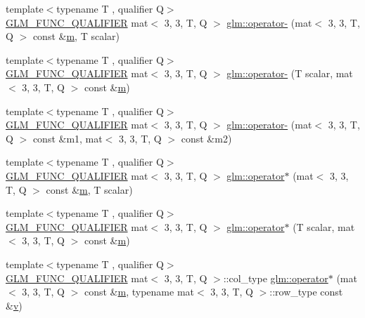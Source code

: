 \begin{DoxyCompactItemize}
\item 
{\footnotesize template$<$typename T , qualifier Q$>$ }\\\mbox{\hyperlink{setup_8hpp_a33fdea6f91c5f834105f7415e2a64407}{G\+L\+M\+\_\+\+F\+U\+N\+C\+\_\+\+Q\+U\+A\+L\+I\+F\+I\+ER}} mat$<$ 3, 3, T, Q $>$ \mbox{\hyperlink{namespaceglm_a96aef508c0b069eacfc88a4aa08a4c5a}{glm\+::operator-\/}} (mat$<$ 3, 3, T, Q $>$ const \&\mbox{\hyperlink{_s_d_l__opengl__glext_8h_af593500c283bf1a787a6f947f503a5c2}{m}}, T scalar)
\item 
{\footnotesize template$<$typename T , qualifier Q$>$ }\\\mbox{\hyperlink{setup_8hpp_a33fdea6f91c5f834105f7415e2a64407}{G\+L\+M\+\_\+\+F\+U\+N\+C\+\_\+\+Q\+U\+A\+L\+I\+F\+I\+ER}} mat$<$ 3, 3, T, Q $>$ \mbox{\hyperlink{namespaceglm_a2e99f96948f8081c4406fecc8f249c90}{glm\+::operator-\/}} (T scalar, mat$<$ 3, 3, T, Q $>$ const \&\mbox{\hyperlink{_s_d_l__opengl__glext_8h_af593500c283bf1a787a6f947f503a5c2}{m}})
\item 
{\footnotesize template$<$typename T , qualifier Q$>$ }\\\mbox{\hyperlink{setup_8hpp_a33fdea6f91c5f834105f7415e2a64407}{G\+L\+M\+\_\+\+F\+U\+N\+C\+\_\+\+Q\+U\+A\+L\+I\+F\+I\+ER}} mat$<$ 3, 3, T, Q $>$ \mbox{\hyperlink{namespaceglm_af224ea664ab27543f4689b64ea9992f3}{glm\+::operator-\/}} (mat$<$ 3, 3, T, Q $>$ const \&m1, mat$<$ 3, 3, T, Q $>$ const \&m2)
\item 
{\footnotesize template$<$typename T , qualifier Q$>$ }\\\mbox{\hyperlink{setup_8hpp_a33fdea6f91c5f834105f7415e2a64407}{G\+L\+M\+\_\+\+F\+U\+N\+C\+\_\+\+Q\+U\+A\+L\+I\+F\+I\+ER}} mat$<$ 3, 3, T, Q $>$ \mbox{\hyperlink{namespaceglm_a65d446761e063f5405800ae6830f3720}{glm\+::operator$\ast$}} (mat$<$ 3, 3, T, Q $>$ const \&\mbox{\hyperlink{_s_d_l__opengl__glext_8h_af593500c283bf1a787a6f947f503a5c2}{m}}, T scalar)
\item 
{\footnotesize template$<$typename T , qualifier Q$>$ }\\\mbox{\hyperlink{setup_8hpp_a33fdea6f91c5f834105f7415e2a64407}{G\+L\+M\+\_\+\+F\+U\+N\+C\+\_\+\+Q\+U\+A\+L\+I\+F\+I\+ER}} mat$<$ 3, 3, T, Q $>$ \mbox{\hyperlink{namespaceglm_a13dbd4ae75ddb6a322a55b40a684cf22}{glm\+::operator$\ast$}} (T scalar, mat$<$ 3, 3, T, Q $>$ const \&\mbox{\hyperlink{_s_d_l__opengl__glext_8h_af593500c283bf1a787a6f947f503a5c2}{m}})
\item 
{\footnotesize template$<$typename T , qualifier Q$>$ }\\\mbox{\hyperlink{setup_8hpp_a33fdea6f91c5f834105f7415e2a64407}{G\+L\+M\+\_\+\+F\+U\+N\+C\+\_\+\+Q\+U\+A\+L\+I\+F\+I\+ER}} mat$<$ 3, 3, T, Q $>$\+::col\+\_\+type \mbox{\hyperlink{namespaceglm_a462fe592c2e973a2c263e10376da9d98}{glm\+::operator$\ast$}} (mat$<$ 3, 3, T, Q $>$ const \&\mbox{\hyperlink{_s_d_l__opengl__glext_8h_af593500c283bf1a787a6f947f503a5c2}{m}}, typename mat$<$ 3, 3, T, Q $>$\+::row\+\_\+type const \&\mbox{\hyperlink{_s_d_l__opengl_8h_a10a82eabcb59d2fcd74acee063775f90}{v}})

\end{DoxyCompactItemize}
